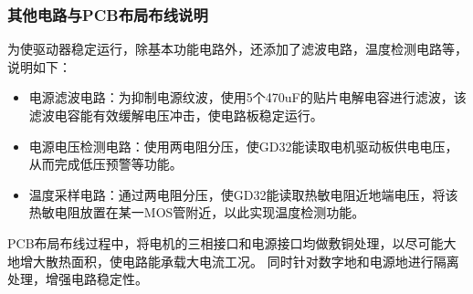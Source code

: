 ﻿\documentclass[12pt,a4paper]{article}
\begin{document}
\subsubsection{其他电路与PCB布局布线说明}
为使驱动器稳定运行，除基本功能电路外，还添加了滤波电路，温度检测电路等，说明如下：
\begin{itemize}
  \item 电源滤波电路：为抑制电源纹波，使用5个470uF的贴片电解电容进行滤波，该滤波电容能有效缓解电压冲击，使电路板稳定运行。
  \item 电源电压检测电路：使用两电阻分压，使GD32能读取电机驱动板供电电压，从而完成低压预警等功能。
  \item 温度采样电路：通过两电阻分压，使GD32能读取热敏电阻近地端电压，将该热敏电阻放置在某一MOS管附近，以此实现温度检测功能。
\end{itemize}

PCB布局布线过程中，将电机的三相接口和电源接口均做敷铜处理，以尽可能大地增大散热面积，使电路能承载大电流工况。
同时针对数字地和电源地进行隔离处理，增强电路稳定性。
\end{document}
